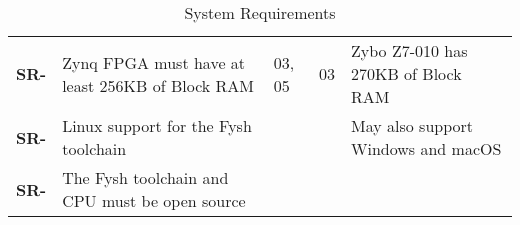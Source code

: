 \resetfyshcounter
\newcommand{\sr}[4]{
	\textbf{SR-\rc} & #1 & #2 & #3 & #4 \\
	\hline
}
\begin{table}[H]
	\begin{tabularx}{\textwidth}{| a | x | a | a | a |}
		\hline

		 &  %
		           &                           %
		           &                           %
		           &                           \\
		\hline
		\sr{Zynq FPGA must have at least 256KB of Block RAM}%
		{03, 05}%
		{03}%
		{Zybo Z7-010 has 270KB of Block RAM} %

		\sr{Linux support for the Fysh toolchain}%
		{}%
		{}%
		{May also support Windows and macOS}

		\sr{The Fysh toolchain and CPU must be open source}%
		{}%
		{}%
		{}
	\end{tabularx}
	\caption{System Requirements}
\end{table}

